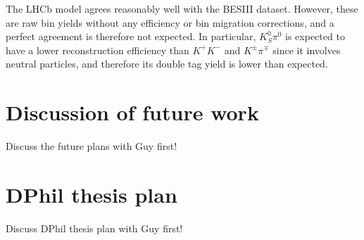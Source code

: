 \documentclass[12pt, a4paper, notitlepage, onecolumn]{article}
\numberwithin{equation}{section}
\begin{document}
The LHCb model agrees reasonably well with the BESIII dataset. However, these are raw bin yields without any efficiency or bin migration corrections, and a perfect agreement is therefore not expected. In particular, $K_S^0\pi^0$ is expected to have a lower reconstruction efficiency than $K^+K^-$ and $K^\pm\pi^\mp$ since it involves neutral particles, and therefore its double tag yield is lower than expected.


\section{Discussion of future work}
\noindent Discuss the future plans with Guy first!





\newpage
\section{DPhil thesis plan}
\noindent Discuss DPhil thesis plan with Guy first!
\end{document}
